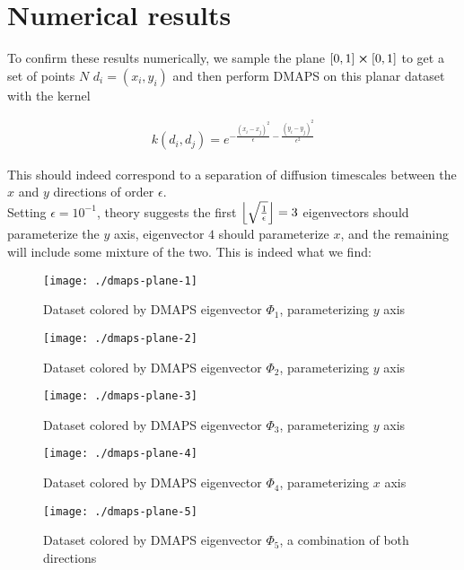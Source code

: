 \documentclass[11pt]{article}
\renewcommand{\includegraphics}[2][]{\fbox{}}
\DeclarePairedDelimiter\floor{\lfloor}{\rfloor}
\begin{document}
\section{Numerical results}

To confirm these results numerically, we sample the plane
$[0,1] \cross [0,1]$ to get a set of points $N$ $d_i = (x_i, y_i)$ and
then perform DMAPS on this planar dataset with the kernel

\begin{align}
  k(d_i,d_j) = e^{- \frac{(x_i - x_j)^2}{\epsilon} -
  \frac{(y_i - y_j)^2}{\epsilon^2}}
\end{align}

This should indeed correspond to a separation of diffusion timescales
between the $x$ and $y$ directions of order $\epsilon$. \\

Setting $\epsilon = 10^{-1}$, theory suggests the first
$\floor*{\sqrt{\frac{1}{\epsilon}}}=3$ eigenvectors should
parameterize the $y$ axis, eigenvector $4$ should parameterize $x$,
and the remaining will include some mixture of the two. This is indeed
what we find:

\begin{figure}[htbp]
  \centering
  \texttt{[image: ./dmaps-plane-1]}
  \caption{Dataset colored by DMAPS eigenvector $\Phi_1$,
    parameterizing $y$ axis}
\end{figure}

\begin{figure}[htbp]
  \centering
  \texttt{[image: ./dmaps-plane-2]}
  \caption{Dataset colored by DMAPS eigenvector $\Phi_2$,
    parameterizing $y$ axis}
\end{figure}

\begin{figure}[htbp]
  \centering
  \texttt{[image: ./dmaps-plane-3]}
  \caption{Dataset colored by DMAPS eigenvector $\Phi_3$,
    parameterizing $y$ axis}
\end{figure}

\begin{figure}[htbp]
  \centering
  \texttt{[image: ./dmaps-plane-4]}
  \caption{Dataset colored by DMAPS eigenvector $\Phi_4$,
    parameterizing $x$ axis}
\end{figure}

\begin{figure}[htbp]
  \centering
  \texttt{[image: ./dmaps-plane-5]}
  \caption{Dataset colored by DMAPS eigenvector $\Phi_5$,
    a combination of both directions}
\end{figure}
\end{document}
